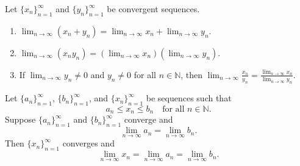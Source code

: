 \documentclass[../main.tex]{subfiles}
\begin{document}
    
    
    
    
    
    
    
    
    
    
    
    
    
    
    
    
    
    \begin{proposition} \label{prop:limit_algebra}
    Let \( \{x_n\}_{n=1}^{\infty} \) and \( \{y_n\}_{n=1}^{\infty} \) be convergent sequences.
    \begin{enumerate}
        \item 
        \(
        \lim_{n\to\infty} (x_n + y_n) = \lim_{n\to\infty} x_n + \lim_{n\to\infty} y_n.
        \)
        \item 
        \(
        \lim_{n\to\infty} (x_n y_n) = \left( \lim_{n\to\infty} x_n \right) \left( \lim_{n\to\infty} y_n \right).
        \)
        \item If \( \lim_{n\to\infty} y_n \neq 0 \) and \( y_n \neq 0 \) for all \( n \in \mathbb{N} \), then
        \(
        \lim_{n\to\infty} \frac{x_n}{y_n} = \frac{\lim_{n\to\infty} x_n}{\lim_{n\to\infty} y_n}.
        \)
    \end{enumerate}
    \end{proposition}
    
    
    
    
    
    
    
    
    
    
    
    
    
    
    
    
    
    
    
    
    
    
    
    
    
    
    
    \begin{lemma} \label{lem:squeeze}
    Let \( \{a_n\}_{n=1}^{\infty} \), \( \{b_n\}_{n=1}^{\infty} \), and \( \{x_n\}_{n=1}^{\infty} \) be sequences such that
    \[
    a_n \leq x_n \leq b_n \quad \text{for all } n \in \mathbb{N}.
    \]
    Suppose \( \{a_n\}_{n=1}^{\infty} \) and \( \{b_n\}_{n=1}^{\infty} \) converge and
    \[
    \lim_{n\to\infty} a_n = \lim_{n\to\infty} b_n.
    \]
    Then \( \{x_n\}_{n=1}^{\infty} \) converges and
    \[
    \lim_{n\to\infty} x_n = \lim_{n\to\infty} a_n = \lim_{n\to\infty} b_n.
    \]
    \end{lemma}
    
\end{document}
